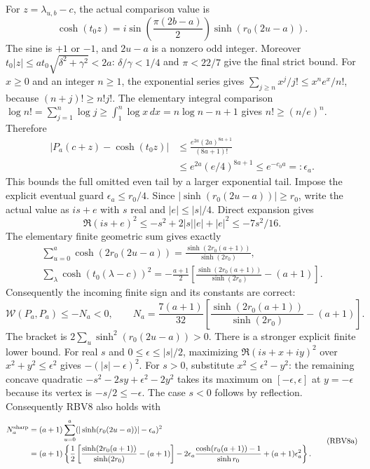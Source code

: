 For $z=\lambda_{u,b}-c$, the actual comparison value is
\[
\cosh(t_0z)=i\sin\!\left(\frac{\pi(2b-a)}2\right)
                   \sinh(r_0(2u-a)).\tag{RBV4}
\]
The sine is $+1$ or $-1$, and $2u-a$ is a nonzero odd integer.
Moreover
$t_0|z|\le at_0\sqrt{\delta^2+\gamma^2}<2a$:
$\delta/\gamma<1/4$ and $\pi<22/7$ give the final strict bound.
For $x\ge0$ and an integer $n\ge1$, the exponential series gives
$\sum_{j\ge n}x^j/j!\le x^ne^x/n!$, because
$(n+j)!\ge n!j!$. The elementary integral comparison
$\log n!=\sum_{j=1}^n\log j\ge\int_1^n\log x\,dx
=n\log n-n+1$ gives $n!\ge(n/e)^n$. Therefore
\[
\begin{split}
|P_a(c+z)-\cosh(t_0z)|
&\le\frac{e^{2a}(2a)^{8a+1}}{(8a+1)!}\\
&\le e^{2a}(e/4)^{8a+1}\le e^{-c_0a}=:\epsilon_a.
\end{split}\tag{RBV5}
\]
This bounds the full omitted even tail by a larger exponential tail.
Impose the explicit eventual guard $\epsilon_a\le r_0/4$.
Since $|\sinh(r_0(2u-a))|\ge r_0$, write the actual value as
$is+e$ with $s$ real and $|e|\le|s|/4$. Direct expansion gives
\[
\Re(is+e)^2\le-s^2+2|s||e|+|e|^2\le-7s^2/16.
\tag{RBV6}
\]
The elementary finite geometric sum gives exactly
\[
\begin{gathered}
\sum_{u=0}^a\cosh(2r_0(2u-a))
=\frac{\sinh(2r_0(a+1))}{\sinh(2r_0)},\\
\sum_{\lambda}\cosh(t_0(\lambda-c))^2
=-\frac{a+1}{2}
 \left[\frac{\sinh(2r_0(a+1))}{\sinh(2r_0)}-(a+1)\right].
\end{gathered}\tag{RBV7}
\]
Consequently the incoming finite sign and its constants are correct:
\[
\boxed{\mathcal W(P_a,P_a)\le-N_a<0,\qquad
N_a=\frac{7(a+1)}{32}
\left[\frac{\sinh(2r_0(a+1))}{\sinh(2r_0)}-(a+1)\right].}
\tag{RBV8}
\]
The bracket is $2\sum_u\sinh^2(r_0(2u-a))>0$.
There is a stronger explicit finite lower bound. For real $s$ and
$0\le\epsilon\le|s|/2$, maximizing $\Re(is+x+iy)^2$ over
$x^2+y^2\le\epsilon^2$ gives $-(|s|-\epsilon)^2$.
For $s>0$, substitute $x^2\le\epsilon^2-y^2$: the remaining
concave quadratic $-s^2-2sy+\epsilon^2-2y^2$ takes its maximum
on $[-\epsilon,\epsilon]$ at $y=-\epsilon$ because its vertex
is $-s/2\le-\epsilon$. The case $s<0$ follows by reflection.
Consequently RBV8 also holds with
\[
\begin{split}
N_a^{\rm sharp}
&=(a+1)\sum_{u=0}^a
 (|\sinh(r_0(2u-a))|-\epsilon_a)^2\\
&=(a+1)\left\{\frac12
 \left[\frac{\sinh(2r_0(a+1))}{\sinh(2r_0)}-(a+1)\right]
-2\epsilon_a\frac{\cosh(r_0(a+1))-1}{\sinh r_0}
 +(a+1)\epsilon_a^2\right\}.
\end{split}\tag{RBV8a}
\]
